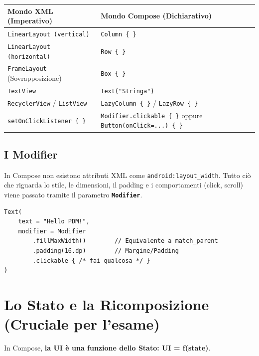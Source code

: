 \begin{table}[h]
    \centering
    \begin{tabularx}{\textwidth}{|X|X|}
\hline
\rowcolor{gray!20} \textbf{Mondo XML (Imperativo)} & \textbf{Mondo Compose (Dichiarativo)} \\ \hline
\texttt{LinearLayout (vertical)} & \texttt{Column \{ \}} \\ \hline
\texttt{LinearLayout (horizontal)} & \texttt{Row \{ \}} \\ \hline
\texttt{FrameLayout} (Sovrapposizione) & \texttt{Box \{ \}} \\ \hline
\texttt{TextView} & \texttt{Text("Stringa")} \\ \hline
\texttt{RecyclerView} / \texttt{ListView} & \texttt{LazyColumn \{ \}} / \texttt{LazyRow \{ \}} \\ \hline
\texttt{setOnClickListener \{ \}} & \texttt{Modifier.clickable \{ \}} oppure \texttt{Button(onClick=...) \{ \}}\\ \hline
    \end{tabularx}
\end{table}

\subsection{I Modifier}
In Compose non esistono attributi XML come \texttt{android:layout\_width}.
Tutto ciò che riguarda lo stile, le dimensioni, il padding e i comportamenti (click, scroll) viene passato tramite il parametro \textbf{\texttt{Modifier}}.

\begin{lstlisting}[caption={Esempio pratico di Modifier}, label={lst:modifier}]
Text(
    text = "Hello PDM!",
    modifier = Modifier
        .fillMaxWidth()        // Equivalente a match_parent
        .padding(16.dp)        // Margine/Padding
        .clickable { /* fai qualcosa */ }
)
\end{lstlisting}

\section{Lo Stato e la Ricomposizione (Cruciale per l'esame)}
In Compose, \textbf{la UI è una funzione dello Stato: UI = f(state)}.

